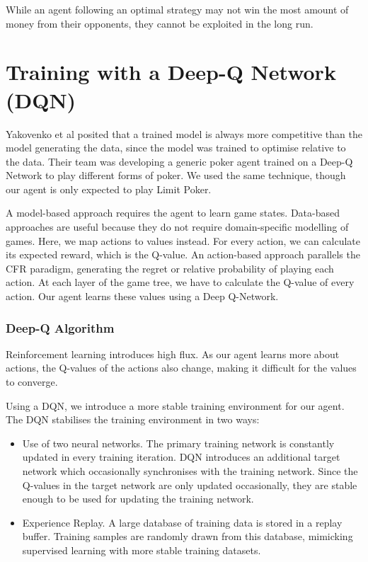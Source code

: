 \documentclass{article}
\begin{document}
While an agent following an optimal strategy may not win the most amount of money from their opponents, they cannot be exploited in the long run. 

\section{Training with a Deep-Q Network (DQN)}

Yakovenko et al posited that a trained model is always more competitive than the model generating the data, since the model was trained to optimise relative to the data. Their team was developing a generic poker agent trained on a Deep-Q Network to play different forms of poker. We used the same technique, though our agent is only expected to play Limit Poker.

A model-based approach requires the agent to learn game states. Data-based approaches are useful because they do not require domain-specific modelling of games. Here, we map actions to values instead. For every action, we can calculate its expected reward, which is the Q-value. An action-based approach parallels the CFR paradigm, generating the regret or relative probability of playing each action. At each layer of the game tree, we have to calculate the Q-value of every action. Our agent learns these values using a Deep Q-Network.

\subsubsection{Deep-Q Algorithm}
Reinforcement learning introduces high flux. As our agent learns more about actions, the Q-values of the actions also change, making it difficult for the values to converge. 

Using a DQN, we introduce a more stable training environment for our agent. The DQN stabilises the training environment in two ways:

\begin{itemize}
	\item Use of two neural networks. The primary training network is constantly updated in every training iteration. DQN introduces an additional target network which occasionally synchronises with the training network. Since the Q-values in the target network are only updated occasionally, they are stable enough to be used for updating the training network.
	\item Experience Replay. A large database of training data is stored in a replay buffer. Training samples are randomly drawn from this database, mimicking supervised learning with more stable training datasets.
\end{itemize}
\end{document}
